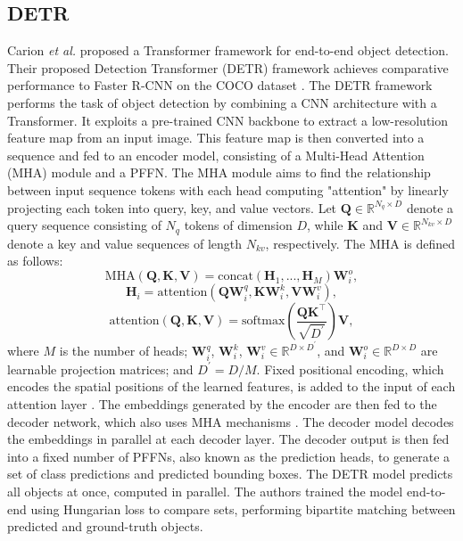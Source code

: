 \documentclass[journal]{IEEEtran}
\begin{document}
\subsection{DETR}\label{subsec:detr}
Carion \textit{et al.} \cite{Carion2020} proposed a Transformer \cite{Vaswani} framework for end-to-end object detection.
Their proposed Detection Transformer (DETR) framework achieves comparative performance to Faster R-CNN \cite{girshick2014rich} on the COCO dataset \cite{lin2014}.
The DETR framework performs the task of object detection by combining a CNN architecture with a Transformer.
It exploits a pre-trained CNN backbone to extract a low-resolution feature map from an input image.
This feature map is then converted into a sequence and fed to an encoder model, consisting of a Multi-Head Attention (MHA) module and a PFFN.
The MHA module aims to find the relationship between input sequence tokens with each head computing "attention" by linearly projecting each token into query, key, and value vectors.
Let $\mathbf{Q} \in \mathbb{R}^{N_q \times D}$ denote a query sequence consisting of $N_q$ tokens of dimension $D$, while $\mathbf{K}$ and $\mathbf{V} \in \mathbb{R}^{N_{kv} \times D}$ denote a key and value sequences of length $N_{kv}$, respectively. 
The MHA is defined as follows:
\begin{equation}
    \text{MHA}(\mathbf{Q}, \mathbf{K}, \mathbf{V}) = \text{concat}(\mathbf{H}_1, ..., \mathbf{H}_{M})\mathbf{W}_i^o,
\end{equation}
\begin{equation}
    \mathbf{H}_i =  \text{attention}(\mathbf{Q}\mathbf{W}_i^q, \mathbf{K}\mathbf{W}_i^k, \mathbf{V}\mathbf{W}_i^v),
\end{equation}
\begin{equation}
    \text{attention}(\mathbf{Q}, \mathbf{K}, \mathbf{V}) = \text{softmax}(\frac{\mathbf{Q}\mathbf{K}^\top}{\sqrt{D^{\prime}}})\mathbf{V},
\end{equation}
where $M$ is the number of heads; $\mathbf{W}_i^q$, $\mathbf{W}_i^k$, $\mathbf{W}_i^v \in \mathbb{R}^{D \times D^{\prime}}$, and $\mathbf{W}_i^o \in \mathbb{R}^{D \times D}$ are learnable projection matrices; and $D^{\prime} = D/M$.
Fixed positional encoding, which encodes the spatial positions of the learned features, is added to the input of each attention layer \cite{Carion2020}.
The embeddings generated by the encoder are then fed to the decoder network, which also uses MHA mechanisms \cite{Carion2020}.
The decoder model decodes the embeddings in parallel at each decoder layer.
The decoder output is then fed into a fixed number of PFFNs, also known as the prediction heads, to generate a set of class predictions and predicted bounding boxes.
The DETR model predicts all objects at once, computed in parallel.
The authors trained the model end-to-end using Hungarian loss to compare sets, performing bipartite matching between predicted and ground-truth objects.
\end{document}
